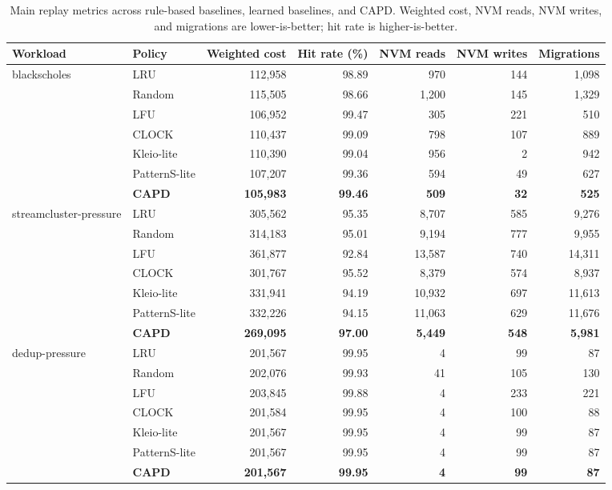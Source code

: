 \begin{table}[t]
  \centering
  \caption{Main replay metrics across rule-based baselines, learned baselines,
  and CAPD. Weighted cost, NVM reads, NVM writes, and migrations are
  lower-is-better; hit rate is higher-is-better.}
  \label{tab:main-results}
  \label{tab:real-main}
  \scriptsize
  \setlength{\tabcolsep}{3.5pt}
  \begin{tabular}{llrrrrr}
    \toprule
    Workload & Policy & Weighted cost & Hit rate (\%) & NVM reads & NVM writes & Migrations \\
    \midrule
    \multirow{7}{*}{blackscholes}
      & LRU & 112{,}958 & 98.89 & 970 & 144 & 1{,}098 \\
      & Random & 115{,}505 & 98.66 & 1{,}200 & 145 & 1{,}329 \\
      & LFU & 106{,}952 & 99.47 & 305 & 221 & 510 \\
      & CLOCK & 110{,}437 & 99.09 & 798 & 107 & 889 \\
      & Kleio-lite & 110{,}390 & 99.04 & 956 & 2 & 942 \\
      & PatternS-lite & 107{,}207 & 99.36 & 594 & 49 & 627 \\
      & \textbf{CAPD} & \textbf{105{,}983} & \textbf{99.46} & \textbf{509} & \textbf{32} & \textbf{525} \\
    \midrule
    \multirow{7}{*}{streamcluster-pressure}
      & LRU & 305{,}562 & 95.35 & 8{,}707 & 585 & 9{,}276 \\
      & Random & 314{,}183 & 95.01 & 9{,}194 & 777 & 9{,}955 \\
      & LFU & 361{,}877 & 92.84 & 13{,}587 & 740 & 14{,}311 \\
      & CLOCK & 301{,}767 & 95.52 & 8{,}379 & 574 & 8{,}937 \\
      & Kleio-lite & 331{,}941 & 94.19 & 10{,}932 & 697 & 11{,}613 \\
      & PatternS-lite & 332{,}226 & 94.15 & 11{,}063 & 629 & 11{,}676 \\
      & \textbf{CAPD} & \textbf{269{,}095} & \textbf{97.00} & \textbf{5{,}449} & \textbf{548} & \textbf{5{,}981} \\
    \midrule
    \multirow{7}{*}{dedup-pressure}
      & LRU & 201{,}567 & 99.95 & 4 & 99 & 87 \\
      & Random & 202{,}076 & 99.93 & 41 & 105 & 130 \\
      & LFU & 203{,}845 & 99.88 & 4 & 233 & 221 \\
      & CLOCK & 201{,}584 & 99.95 & 4 & 100 & 88 \\
      & Kleio-lite & 201{,}567 & 99.95 & 4 & 99 & 87 \\
      & PatternS-lite & 201{,}567 & 99.95 & 4 & 99 & 87 \\
      & \textbf{CAPD} & \textbf{201{,}567} & \textbf{99.95} & \textbf{4} & \textbf{99} & \textbf{87} \\
    \bottomrule
  \end{tabular}
\end{table}


